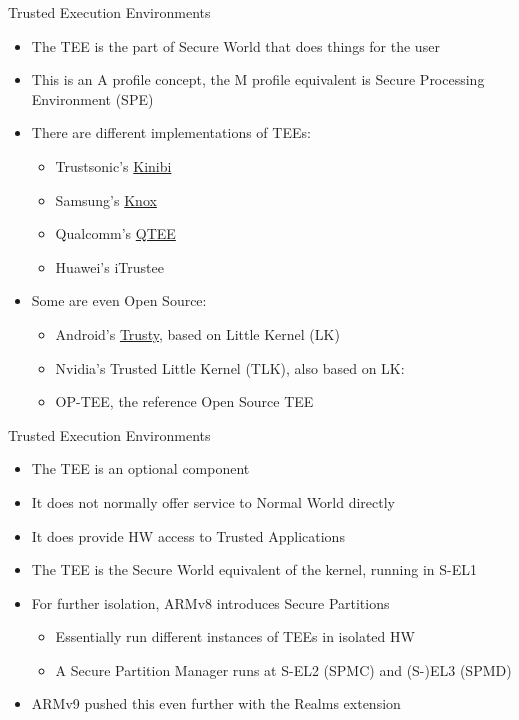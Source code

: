 \begin{frame}{Trusted Execution Environments}
  \begin{itemize}
    \item The TEE is the part of Secure World that does things for the user
    \item This is an A profile concept, the M profile equivalent is Secure Processing Environment (SPE)
    \item There are different implementations of TEEs:
    \begin{itemize}
      \item Trustsonic's \href{https://www.trustonic.com/secure-os/technology/}{Kinibi}
      \item Samsung's \href{https://www.samsungknox.com/en}{Knox}
      \item Qualcomm's \href{https://docs.qualcomm.com/doc/80-88500-4/topic/78_Qualcomm_TEE_5_0.html}{QTEE}
      \item Huawei's iTrustee
    \end{itemize}
    \item Some are even Open Source:
    \begin{itemize}
      \item Android's \href{https://source.android.com/docs/security/features/trusty}{Trusty},
            based on Little Kernel (LK)
      \item Nvidia's Trusted Little Kernel (TLK), also based on LK: 
      \item OP-TEE, the reference Open Source TEE
    \end{itemize}
  \end{itemize}
\end{frame}

\begin{frame}{Trusted Execution Environments}
  \begin{itemize}
    \item The TEE is an optional component
    \item It does not normally offer service to Normal World directly
    \item It does provide HW access to Trusted Applications
    \item The TEE is the Secure World equivalent of the kernel, running in S-EL1
    \item For further isolation, ARMv8 introduces Secure Partitions
    \begin{itemize}
      \item Essentially run different instances of TEEs in isolated HW
      \item A Secure Partition Manager runs at S-EL2 (SPMC) and (S-)EL3 (SPMD)
    \end{itemize}
    \item ARMv9 pushed this even further with the Realms extension
  \end{itemize}
\end{frame}

